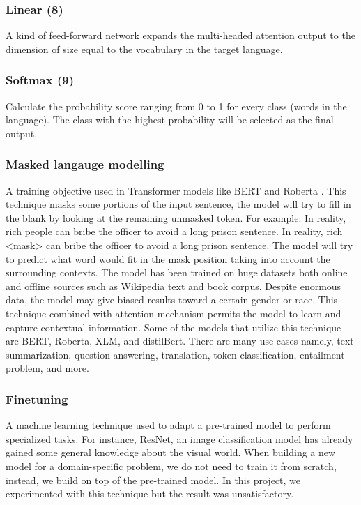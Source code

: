 \documentclass[12pt,oneside,openright,a4paper]{cpe-english-project}
\begin{document}
\subsubsection{Linear (8)}
A kind of feed-forward network expands the multi-headed attention output to the dimension of size equal to the vocabulary in the target language. 

\subsubsection{Softmax (9)}
Calculate the probability score ranging from 0 to 1 for every class (words in the language). The class with the highest probability will be selected as the final output.

\subsubsection{Masked langauge modelling}
A training objective used in Transformer models like BERT \cite{j} and Roberta \cite{u}. This technique masks some portions of the input sentence, the model will try to fill in the blank by looking at the remaining unmasked token. For example: 
In reality, rich people can bribe the officer to avoid a long prison sentence.
In reality, rich <mask> can bribe the officer to avoid a long prison sentence.
The model will try to predict what word would fit in the mask position taking into account the surrounding contexts. The model has been trained on huge datasets both online and offline sources such as Wikipedia text and book corpus. Despite enormous data, the model may give biased results toward a certain gender or race.
This technique combined with attention mechanism permits the model to learn and capture contextual information. Some of the models that utilize this technique are BERT, Roberta, XLM, and distilBert. There are many use cases namely, text summarization, question answering, translation, token classification, entailment problem, and more.


\subsubsection{Finetuning}
A machine learning technique used to adapt a pre-trained model to perform specialized tasks. For instance, ResNet, an image classification model has already gained some general knowledge about the visual world. When building a new model for a domain-specific problem, we do not need to train it from scratch, instead, we build on top of the pre-trained model. In this project, we experimented with this technique but the result was unsatisfactory. 
\end{document}
